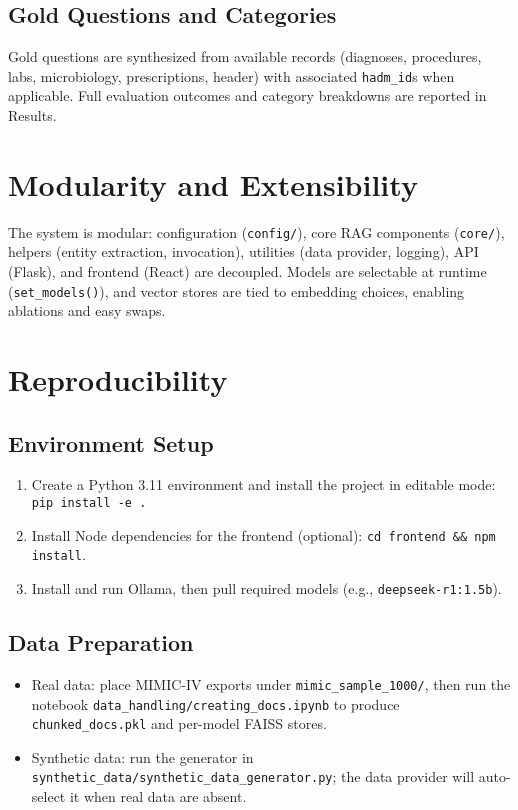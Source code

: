 \subsection{Gold Questions and Categories}
Gold questions are synthesized from available records (diagnoses, procedures, labs, microbiology, prescriptions, header) with associated \texttt{hadm\_id}s when applicable. Full evaluation outcomes and category breakdowns are reported in Results.

\section{Modularity and Extensibility}
The system is modular: configuration (\texttt{config/}), core RAG components (\texttt{core/}), helpers (entity extraction, invocation), utilities (data provider, logging), API (Flask), and frontend (React) are decoupled. Models are selectable at runtime (\texttt{set\_models()}), and vector stores are tied to embedding choices, enabling ablations and easy swaps.

\section{Reproducibility}
\subsection{Environment Setup}
\begin{enumerate}
  \item Create a Python 3.11 environment and install the project in editable mode: \texttt{pip install -e .}
  \item Install Node dependencies for the frontend (optional): \texttt{cd frontend \&\& npm install}.
  \item Install and run Ollama, then pull required models (e.g., \texttt{deepseek-r1:1.5b}).
\end{enumerate}

\subsection{Data Preparation}
\begin{itemize}
  \item Real data: place MIMIC-IV exports under \texttt{mimic\_sample\_1000/}, then run the notebook \texttt{data\_handling/creating\_docs.ipynb} to produce \texttt{chunked\_docs.pkl} and per-model FAISS stores.
  \item Synthetic data: run the generator in \texttt{synthetic\_data/synthetic\_data\_generator.py}; the data provider will auto-select it when real data are absent.
\end{itemize}

